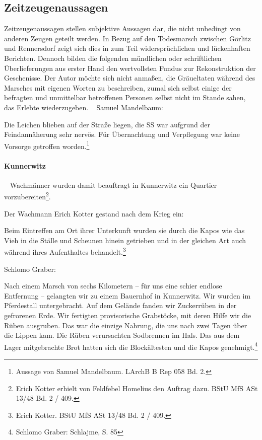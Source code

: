 \subsection{Zeitzeugenaussagen}
Zeitzeugenaussagen stellen subjektive Aussagen dar, die nicht unbedingt von anderen Zeugen geteilt werden. In Bezug auf den Todesmarsch zwischen Görlitz und Rennersdorf zeigt sich dies in zum Teil widersprüchlichen und lückenhaften Berichten.   
Dennoch bilden die folgenden mündlichen oder schriftlichen Überlieferungen aus erster Hand den wertvollsten Fundus zur Rekonstruktion der Geschenisse. Der Autor möchte sich nicht anmaßen, die Gräueltaten während des Marsches mit eigenen Worten zu beschreiben, zumal sich selbst einige der befragten und unmittelbar betroffenen Personen selbst nicht im Stande sahen, das Erlebte wiederzugeben. 
~\newline
Samuel Mandelbaum:
\begin{leftbar}   
 Die Leichen blieben auf der Straße liegen, die SS war aufgrund der Feindannäherung sehr nervös. Für Übernachtung und Verpflegung war keine Vorsorge getroffen worden.\footnote{Aussage von Samuel Mandelbaum. LArchB B Rep 058 Bd. 2.}
\end{leftbar}

\paragraph{Kunnerwitz}
~\newline
Wachmänner wurden damit beauftragt in Kunnerwitz ein Quartier vorzubereiten\footnote{Erich Kotter erhielt von Feldfebel Homelius den Auftrag dazu. BStU MfS ASt 13/48 Bd. 2 / 409.}.

Der Wachmann Erich Kotter gestand nach dem Krieg ein:
\begin{leftbar}   
Beim Eintreffen am Ort ihrer Unterkunft wurden sie durch die Kapos wie das Vieh in die Ställe und Scheunen hinein getrieben und in der gleichen Art auch während ihres Aufenthaltes behandelt.\footnote{Erich Kotter. BStU MfS ASt 13/48 Bd. 2 / 409.}
\end{leftbar}

Schlomo Graber:
\begin{leftbar} 
Nach einem Marsch von sechs Kilometern -- für uns eine schier endlose Entfernung -- gelangten wir zu einem Bauernhof in Kunnerwitz. Wir wurden im Pferdestall untergebracht. Auf dem Gelände fanden wir Zuckerrüben in der gefrorenen Erde. Wir fertigten provisorische Grabstöcke, mit deren Hilfe wir die Rüben ausgruben. Das war die einzige Nahrung, die uns nach zwei Tagen über die Lippen kam. Die Rüben verursachten Sodbrennen im Hals. Das aus dem Lager mitgebrachte Brot hatten sich die Blockältesten und die Kapos genehmigt.\footnote{Schlomo Graber: Schlajme, S. 85}
\end{leftbar}


